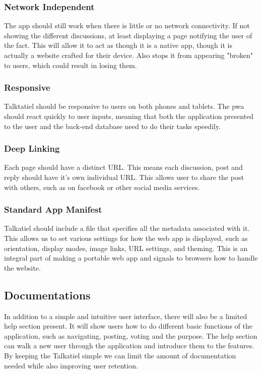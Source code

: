 \documentclass[12pt]{article}
\begin{document}
\subsubsection{Network Independent}
The app should still work when there is little or no network connectivity.
If not showing the different discussions, at least displaying a page notifying the user of the fact.  This will allow it to act as though it is a native app, though it is actually a website crafted for their device.  Also stops it from appearing "broken" to users, which could result in losing them.
\subsubsection{Responsive}
Talktatiel should be responsive to users on both phones and tablets.  The pwa should react quickly to user inputs, meaning that both the application presented to the user and the back-end database need to do their tasks speedily.
\subsubsection{Deep Linking}
Each page should have a distinct URL.  This means each discussion, post and reply should have it's own individual URL.  This allows user to share the post with others, such as on facebook or other social media services.
\subsubsection{Standard App Manifest}
Talkatiel should include a file that specifies all the metadata associated with it.
This allows us to set various settings for how the web app is displayed, such as orientation, display modes, image links, URL settings, and theming.  This is an integral part of making a portable web app and signals to browsers how to handle the website.
\subsection{Documentations}
In addition to a simple and intuitive user interface, there will also be a limited help section present.  It will show users how to do different basic functions of the application, such as navigating, posting, voting and the purpose.  The help section can walk a new user through the application and introduce them to the features.  By keeping the Talkatiel simple we can limit the amount of documentation needed while also improving user retention.
\end{document}

